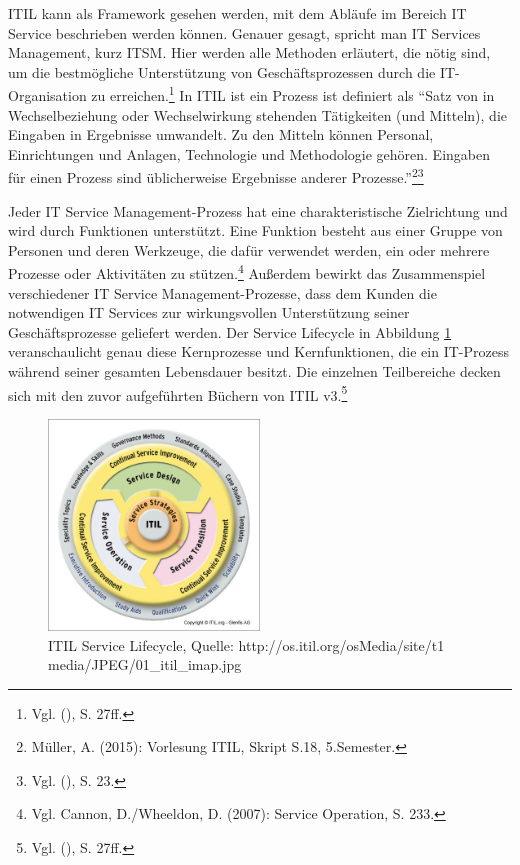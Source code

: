 \noindent
ITIL kann als Framework gesehen werden, mit dem Abläufe im Bereich IT Service beschrieben werden können. Genauer gesagt, spricht man IT Services Management, kurz ITSM. Hier werden alle Methoden erläutert, die nötig sind, um die bestmögliche Unterstützung von Geschäftsprozessen durch die IT-Organisation zu erreichen.\footnote{Vgl. \citeauthor{Ebel} (\citeyear{Ebel}), S. 27ff.} In ITIL ist ein Prozess ist definiert als \enquote{Satz von in Wechselbeziehung oder Wechselwirkung stehenden Tätigkeiten (und Mitteln), die Eingaben in Ergebnisse umwandelt. Zu den Mitteln können Personal, Einrichtungen und Anlagen, Technologie und Methodologie gehören. Eingaben für einen Prozess sind üblicherweise  Ergebnisse anderer Prozesse.}\footnote{Müller, A. (2015): Vorlesung ITIL, Skript S.18, 5.Semester.}\footnote{Vgl. \citeauthor{ISO9000} (\citeyear{ISO9000}), S. 23.}

\noindent
Jeder IT Service Management-Prozess hat eine charakteristische Zielrichtung und wird durch Funktionen unterstützt. Eine Funktion besteht aus einer Gruppe von Personen und deren Werkzeuge, die dafür verwendet werden, ein oder mehrere Prozesse oder Aktivitäten zu stützen.\footnote{ Vgl. Cannon, D./Wheeldon, D. (2007): Service Operation, S. 233.} Außerdem bewirkt das Zusammenspiel verschiedener IT Service Management-Prozesse, dass dem Kunden die notwendigen IT Services zur wirkungsvollen Unterstützung seiner Geschäftsprozesse geliefert werden. Der Service Lifecycle in Abbildung \ref{fig:ITIL_Lebenyzyklus} veranschaulicht genau diese Kernprozesse und Kernfunktionen, die ein IT-Prozess während seiner gesamten Lebensdauer besitzt. Die einzelnen Teilbereiche decken sich mit den zuvor aufgeführten Büchern von ITIL v3.\footnote{Vgl. \citeauthor{Ebel} (\citeyear{Ebel}), S. 27ff.}

\begin{figure}[h!]
\centering
	\includegraphics[width=0.50\textwidth]{Abbildungen/ITIL_Lebenszyklus}
	\caption[ITIL Service Lifecycle]{ITIL Service Lifecycle, Quelle: http://os.itil.org/osMedia/site/t1 
	media/JPEG/01\_itil\_imap.jpg}
	\label{fig:ITIL_Lebenyzyklus}
\end{figure}

